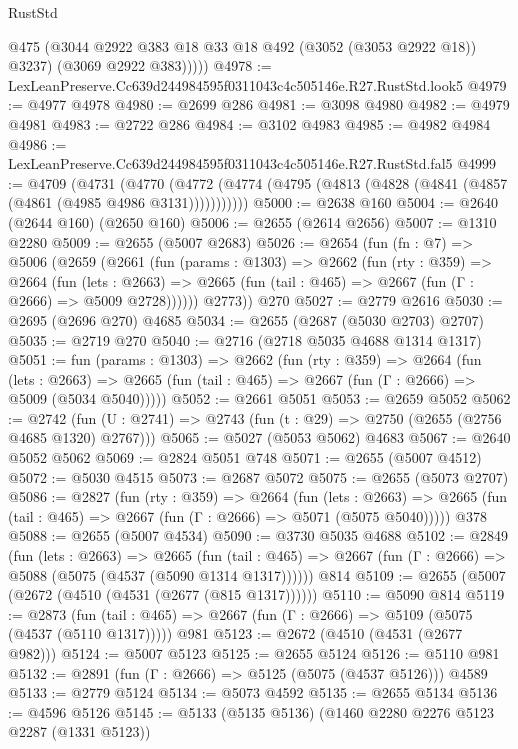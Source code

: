 \begin{lexlean}{RustStd}
\begin{coremodule}
            @475
            (@3044 @2922 @383 @18 @33 @18 @492 (@3052 (@3053 @2922 @18)) @3237)
            (@3069 @2922 @383)))))
@4978 := LexLeanPreserve.Cc639d244984595f0311043c4c505146e.R27.RustStd.look5
@4979 := @4977 @4978
@4980 := @2699 @286
@4981 := @3098 @4980
@4982 := @4979 @4981
@4983 := @2722 @286
@4984 := @3102 @4983
@4985 := @4982 @4984
@4986 := LexLeanPreserve.Cc639d244984595f0311043c4c505146e.R27.RustStd.fal5
@4999 := @4709
    (@4731
      (@4770 (@4772 (@4774 (@4795 (@4813 (@4828 (@4841 (@4857 (@4861 (@4985 @4986 @3131)))))))))))
@5000 := @2638 @160
@5004 := @2640 (@2644 @160) (@2650 @160)
@5006 := @2655 (@2614 @2656)
@5007 := @1310 @2280
@5009 := @2655 (@5007 @2683)
@5026 := @2654
    (fun (fn : @7) =>
    @5006
      (@2659
        (@2661
          (fun (params : @1303) =>
          @2662
            (fun (rty : @359) =>
            @2664
              (fun (lets : @2663) =>
              @2665 (fun (tail : @465) => @2667 (fun (Γ : @2666) => @5009 @2728))))))
        @2773))
    @270
@5027 := @2779 @2616
@5030 := @2695 (@2696 @270) @4685
@5034 := @2655 (@2687 (@5030 @2703) @2707)
@5035 := @2719 @270
@5040 := @2716 (@2718 @5035 @4688 @1314 @1317)
@5051 := fun (params : @1303) =>
  @2662
    (fun (rty : @359) =>
    @2664
      (fun (lets : @2663) =>
      @2665 (fun (tail : @465) => @2667 (fun (Γ : @2666) => @5009 (@5034 @5040)))))
@5052 := @2661 @5051
@5053 := @2659 @5052
@5062 := @2742 (fun (U : @2741) => @2743 (fun (t : @29) => @2750 (@2655 (@2756 @4685 @1320) @2767)))
@5065 := @5027 (@5053 @5062) @4683
@5067 := @2640 @5052 @5062
@5069 := @2824 @5051 @748
@5071 := @2655 (@5007 @4512)
@5072 := @5030 @4515
@5073 := @2687 @5072
@5075 := @2655 (@5073 @2707)
@5086 := @2827
    (fun (rty : @359) =>
    @2664
      (fun (lets : @2663) =>
      @2665 (fun (tail : @465) => @2667 (fun (Γ : @2666) => @5071 (@5075 @5040)))))
    @378
@5088 := @2655 (@5007 @4534)
@5090 := @3730 @5035 @4688
@5102 := @2849
    (fun (lets : @2663) =>
    @2665
      (fun (tail : @465) => @2667 (fun (Γ : @2666) => @5088 (@5075 (@4537 (@5090 @1314 @1317))))))
    @814
@5109 := @2655 (@5007 (@2672 (@4510 (@4531 (@2677 (@815 @1317))))))
@5110 := @5090 @814
@5119 := @2873
    (fun (tail : @465) => @2667 (fun (Γ : @2666) => @5109 (@5075 (@4537 (@5110 @1317)))))
    @981
@5123 := @2672 (@4510 (@4531 (@2677 @982)))
@5124 := @5007 @5123
@5125 := @2655 @5124
@5126 := @5110 @981
@5132 := @2891 (fun (Γ : @2666) => @5125 (@5075 (@4537 @5126))) @4589
@5133 := @2779 @5124
@5134 := @5073 @4592
@5135 := @2655 @5134
@5136 := @4596 @5126
@5145 := @5133 (@5135 @5136) (@1460 @2280 @2276 @5123 @2287 (@1331 @5123))

\end{coremodule}
\end{lexlean}
